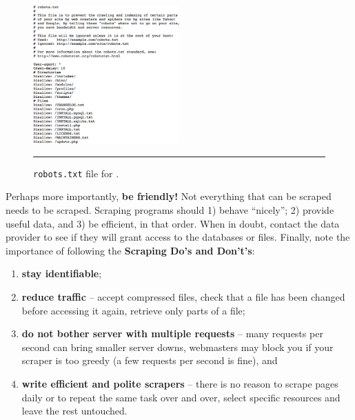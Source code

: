 \begin{figure}[t]
\centering
\includegraphics[width=0.50\textwidth]{Images/CQADS_robots.png}
\caption[\small \texttt{robots.txt} file for a random webpage]{\small \texttt{robots.txt} file for .}\hrule\label{fig:robots}
\end{figure}
\afterpage{\FloatBarrier}
\newl Perhaps more importantly, \textbf{be friendly!} Not everything that can be scraped needs to be scraped. Scraping programs should 1) behave ``nicely''; 2) provide useful data, and 3) be efficient, in that order. When in doubt, contact the data provider to see if they will grant access to the databases or files. 
\newpage\noindent Finally, note the importance of following the \textbf{Scraping Do's and Don't's}:
\begin{enumerate}[noitemsep]
    \item \textbf{stay identifiable};
    \item \textbf{reduce traffic} -- accept compressed files, check that a file has been changed before accessing it again, retrieve only parts of a file;
    \item \textbf{do not bother server with multiple requests} --  many requests per second can bring smaller server downs, webmasters may block you if your scraper is too greedy (a few requests per second is fine), and
    \item \textbf{write efficient and polite scrapers} -- there is no reason to scrape pages daily or to repeat the same task over and over, select specific resources and leave the rest untouched. 
\end{enumerate}
